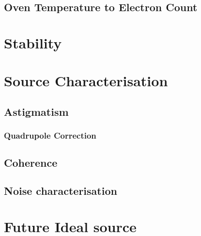 \subsection{Oven Temperature to Electron Count}

\section{Stability}\label{section:stability}

\section{Source Characterisation}

\subsection{Astigmatism}

\subsubsection{Quadrupole Correction}\label{section:quadrupole}

\subsection{Coherence}

\subsection{Noise characterisation}

\section{Future Ideal source}